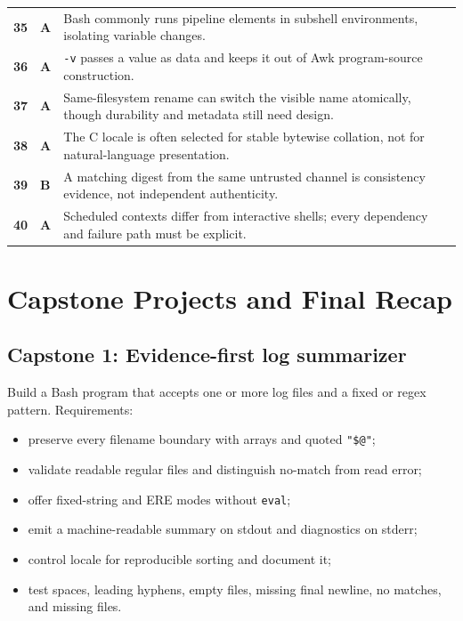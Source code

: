 \documentclass[11pt,oneside,openany]{book}
\begin{document}
\begin{longtable}{>{\bfseries}p{}>{\bfseries\color{Blue}}p{}p{}}
35 & A & Bash commonly runs pipeline elements in subshell environments, isolating variable changes. \\
36 & A & \texttt{-v} passes a value as data and keeps it out of Awk program-source construction. \\
37 & A & Same-filesystem rename can switch the visible name atomically, though durability and metadata still need design. \\
38 & A & The C locale is often selected for stable bytewise collation, not for natural-language presentation. \\
39 & B & A matching digest from the same untrusted channel is consistency evidence, not independent authenticity. \\
40 & A & Scheduled contexts differ from interactive shells; every dependency and failure path must be explicit. \\
\bottomrule
\end{longtable}

\chapter{Capstone Projects and Final Recap}
\section{Capstone 1: Evidence-first log summarizer}
Build a Bash program that accepts one or more log files and a fixed or regex pattern. Requirements:
\begin{itemize}
  \item preserve every filename boundary with arrays and quoted \texttt{"\$@"};
  \item validate readable regular files and distinguish no-match from read error;
  \item offer fixed-string and ERE modes without \texttt{eval};
  \item emit a machine-readable summary on stdout and diagnostics on stderr;
  \item control locale for reproducible sorting and document it;
  \item test spaces, leading hyphens, empty files, missing final newline, no matches, and missing files.
\end{itemize}
\end{document}
